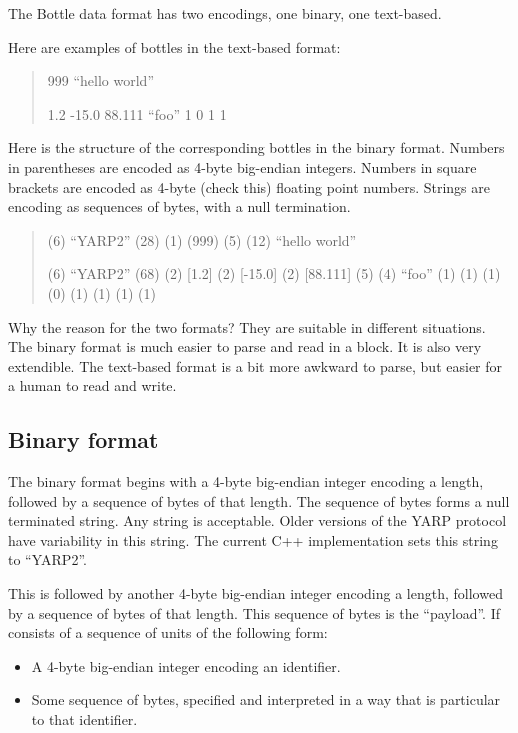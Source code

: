 The Bottle data format has two encodings, one binary, one text-based.

Here are examples of bottles in the text-based format:

\begin{quote}

  999 ``hello world''

  1.2 -15.0 88.111 ``foo'' 1 0 1 1

\end{quote}

Here is the structure of the corresponding bottles in the binary format.
Numbers in parentheses are encoded as 4-byte big-endian integers.
Numbers in square brackets are encoded as 4-byte
(check this) floating point numbers.
Strings are encoding as sequences of bytes, with a null termination.

\begin{quote}

  (6) ``YARP2'' (28) (1) (999) (5) (12) ``hello world''

  (6) ``YARP2'' (68) (2) [1.2] (2) [-15.0] (2) [88.111] (5) (4) ``foo'' (1) (1) (1) (0) (1) (1) (1) (1)

\end{quote}


Why the reason for the two formats?  They are suitable in different
situations.  The binary format is much easier to parse and read in
a block.  It is also very extendible.  The text-based format is
a bit more awkward to parse, but easier for a human to read and write.


\subsection{Binary format}

The binary format begins with a 4-byte big-endian integer encoding a
length, followed by a sequence of bytes of that length.  The sequence
of bytes forms a null terminated string.  Any string is acceptable.
Older versions of the YARP protocol have variability in this string.
The current C++ implementation sets this string to ``YARP2''.

This is followed by another 4-byte big-endian integer encoding
a length, followed by a sequence of bytes of that length.  This
sequence of bytes is the ``payload''.  If consists of a
sequence of units of the following form:

\begin{itemize} \pflist
  \item A 4-byte big-endian integer encoding an identifier.
  \item Some sequence of bytes, specified and interpreted
    in a way that is particular to that identifier.
\end{itemize}

